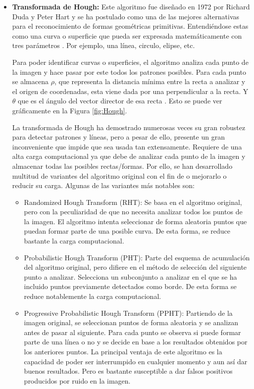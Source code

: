 \begin{itemize}
\item \textbf{Transformada de Hough:} Este algoritmo fue diseñado en 1972 por Richard Duda y Peter Hart \cite{hough} y se ha postulado como una de las mejores alternativas para el reconocimiento de formas geométricas primitivas. Entendiéndose estas como una curva o superficie que pueda ser expresada matemáticamente con tres parámetros \cite{hough}. Por ejemplo, una línea, circulo, elipse, etc.

Para poder identificar curvas o superficies, el algoritmo analiza cada punto de la imagen y hace pasar por este todos los patrones posibles. Para cada punto se almacena $\rho$, que representa la distancia mínima entre la recta a analizar y el origen de coordenadas, esta viene dada por una perpendicular a la recta. Y $\theta$ que es el ángulo del vector director de esa recta \cite{hough2}. Esto se puede ver gráficamente en la Figura \ref{fig:Hough}.

La transformada de Hough ha demostrado numerosas veces su gran robustez para detectar patrones y líneas, pero a pesar de ello, presente un gran inconveniente que impide que sea usada tan extensamente. Requiere de una alta carga computacional ya que debe de analizar cada punto de la imagen y almacenar todas las posibles rectas/formas. Por ello, se han desarrollado multitud de variantes del algoritmo original con el fin de o mejorarlo o reducir su carga. Algunas de las variantes más notables son:

\begin{itemize}
\item Randomized Hough Transform (RHT): Se basa en el algoritmo original, pero con la peculiaridad de que no necesita analizar todos los puntos de la imagen. El algoritmo intenta seleccionar de forma aleatoria puntos que puedan formar parte de una posible curva. De esta forma, se reduce bastante la carga computacional.
	
\item Probabilistic Hough Transform (PHT): Parte del esquema de acumulación del algoritmo original, pero difiere en el método de selección del siguiente punto a analizar. Selecciona un subconjunto a analizar en el que se ha incluido puntos previamente detectados como borde. De esta forma se reduce notablemente la carga computacional.
		
\item Progressive Probabilistic Hough Transform (PPHT): Partiendo de la imagen original, se seleccionan puntos de forma aleatoria y se analizan antes de pasar al siguiente. Para cada punto se observa si puede formar parte de una línea o no y se decide en base a los resultados obtenidos por los anteriores puntos. La principal ventaja de este algoritmo es la capacidad de poder ser interrumpido en cualquier momento y aun así dar buenos resultados. Pero es bastante susceptible a dar falsos positivos producidos por ruido en la imagen.
\end{itemize}

\end{itemize}

